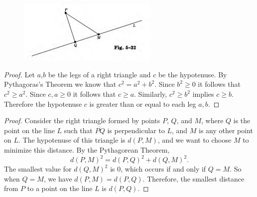\begin{figure}[h]
    \centering
    \includegraphics[width=0.6\textwidth]{images/5_12.png}
\end{figure}

\begin{proof}
    Let $a$,$b$ be the legs of a right triangle and $c$ be the hypotenuse.
    By Pythagoras's Theorem we know that $c^2 = a^2 + b^2$.
    Since $b^2 \ge 0$ it follows that $c^2 \ge a^2$.
    Since $c, a \ge 0$ it follows that $c \ge a$.
    Similarly, $c^2 \ge b^2$ implies $c \ge b$.  
    Therefore the hypotenuse $c$ is greater than or equal to each leg $a, b$.
\end{proof}

\begin{proof}
    Consider the right triangle formed by points $P$, $Q$, and $M$, 
        where $Q$ is the point on the line $L$ such that $\overline{PQ}$ is perpendicular to $L$, 
    and $M$ is any other point on $L$.  
    The hypotenuse of this triangle is $d(P, M)$, and we want to choose $M$ to minimize this distance.  
    By the Pythagorean Theorem,  
    \[
        d(P, M)^2 = d(P, Q)^2 + d(Q, M)^2.
    \]
    The smallest value for $d(Q, M)^2$ is $0$, which occurs if and only if $Q = M$.  
    So when $Q = M$, we have $d(P, M) = d(P, Q)$.  
    Therefore, the smallest distance from $P$ to a point on the line $L$ is $d(P, Q)$.
\end{proof}

